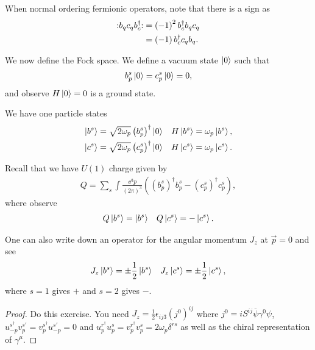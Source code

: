 
When normal ordering fermionic operators, note that there is a sign as
\begin{align}
    :\mathrel{b_q c_q b_c^{\dag}}: &= \left( -1 \right)^2 b_c^{\dag} b_q c_q \\
    &= \left( -1 \right) b_c^{\dag} c_q b_q 
.\end{align}

We now define the Fock space. We define a vacuum state $\ket{0}$ such that
\begin{align}
    b_p^{s} \ket{0} = c_p^{s} \ket{0} = 0
,\end{align}
and observe $H \ket{0}= 0$ is a ground state.

We have one particle states
\begin{align}
    \ket{b^{s}} = \sqrt{2\omega_p} \left( b_p^{s} \right)^{\dag} \ket{0}  && H \ket{b^{s}} = \omega_p \ket{b^{s}}, \\
    \ket{c^{s}} = \sqrt{2\omega_p}  \left( c^{s}_p \right)^{\dag} \ket{0} && H \ket{c^{s}} = \omega_p \ket{c^{s}}
.\end{align}

Recall that we have $U\left( 1 \right) $ charge given by
\begin{align}
    Q = \sum_{s}^{} \int \frac{\dd{^3p}}{\left( 2\pi\right)^3} \left( \left( b^{s}_p \right)^{\dag} b_p^{s} - \left( c^{s}_p \right)^{\dag} c_p^{s} \right) 
,\end{align}
where observe
\begin{align}
    Q \ket{b^{s}} = \ket{b^{s}} && Q \ket{c^{s}} = - \ket{c^{s}}
.\end{align}

One can also write down an operator for the angular momentum $J_z$ at $\vec{p} = 0$ and see
\begin{align}
    J_{z} \ket{b^{s}} = \pm \frac{1}{2} \ket{b^{s}} && J_z \ket{c^{s}} = \pm \frac{1}{2} \ket{c^{s}}
,\end{align}
where $s = 1 $ gives $+$ and $s = 2$ gives $-$.

\begin{proof}
    Do this exercise. You need $ J_z = \frac{1}{2}\epsilon_{ij 3} \left( j^{0} \right)^{ij}$ where $j^{0} = i S^{ij} \overline{\psi} \gamma^{0} \psi$, $u_{-p}^{s^{\dag}} v_{p}^{s'} = v_{p}^{s^{\dag}} u_{-p}^{s'} = 0$ and $u^{r^{\dag}}_{p} u^{s}_p = v^{r^{\dag}}_p v_p^{s} =  2 \omega_p \delta^{rs}$ as well as the chiral representation of $\gamma^{\mu}$.
\end{proof}

